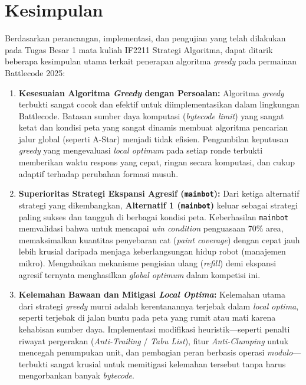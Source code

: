 \section{Kesimpulan}

Berdasarkan perancangan, implementasi, dan pengujian yang telah dilakukan pada Tugas Besar 1 mata kuliah IF2211 Strategi Algoritma, dapat ditarik beberapa kesimpulan utama terkait penerapan algoritma \textit{greedy} pada permainan Battlecode 2025:

\begin{enumerate}
    \item \textbf{Kesesuaian Algoritma \textit{Greedy} dengan Persoalan:}
    Algoritma \textit{greedy} terbukti sangat cocok dan efektif untuk diimplementasikan dalam lingkungan Battlecode. Batasan sumber daya komputasi (\textit{bytecode limit}) yang sangat ketat dan kondisi peta yang sangat dinamis membuat algoritma pencarian jalur global (seperti A-Star) menjadi tidak efisien. Pengambilan keputusan \textit{greedy} yang mengevaluasi \textit{local optimum} pada setiap ronde terbukti memberikan waktu respons yang cepat, ringan secara komputasi, dan cukup adaptif terhadap perubahan formasi musuh.

    \item \textbf{Superioritas Strategi Ekspansi Agresif (\texttt{mainbot}):}
    Dari ketiga alternatif strategi yang dikembangkan, \textbf{Alternatif 1 (\texttt{mainbot})} keluar sebagai strategi paling sukses dan tangguh di berbagai kondisi peta. Keberhasilan \texttt{mainbot} memvalidasi bahwa untuk mencapai \textit{win condition} penguasaan 70\% area, memaksimalkan kuantitas penyebaran cat (\textit{paint coverage}) dengan cepat jauh lebih krusial daripada menjaga keberlangsungan hidup robot (manajemen mikro). Mengabaikan mekanisme pengisian ulang (\textit{refill}) demi ekspansi agresif ternyata menghasilkan \textit{global optimum} dalam kompetisi ini.

    \item \textbf{Kelemahan Bawaan dan Mitigasi \textit{Local Optima}:}
    Kelemahan utama dari strategi \textit{greedy} murni adalah kerentanannya terjebak dalam \textit{local optima}, seperti terjebak di jalan buntu pada peta yang rumit atau mati karena kehabisan sumber daya. Implementasi modifikasi heuristik—seperti penalti riwayat pergerakan (\textit{Anti-Trailing} / \textit{Tabu List}), fitur \textit{Anti-Clumping} untuk mencegah penumpukan unit, dan pembagian peran berbasis operasi \textit{modulo}—terbukti sangat krusial untuk memitigasi kelemahan tersebut tanpa harus mengorbankan banyak \textit{bytecode}.


\end{enumerate}

